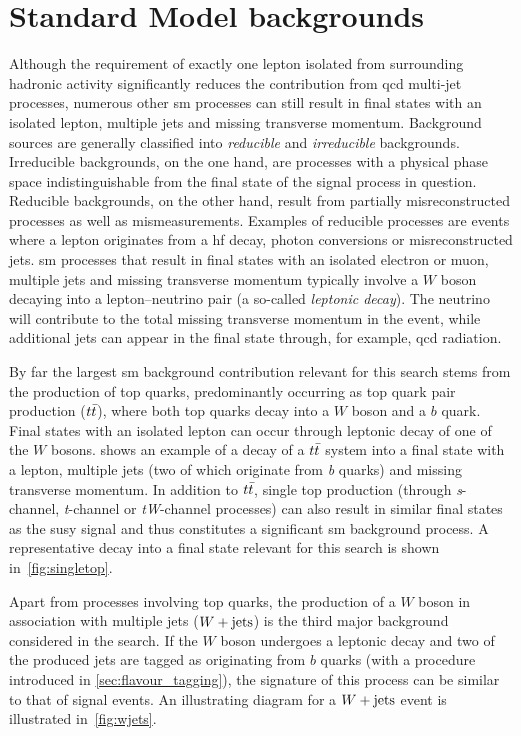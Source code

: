 \section{Standard Model backgrounds}

Although the requirement of exactly one lepton isolated from surrounding hadronic activity significantly reduces the contribution from \gls{qcd} multi-jet processes, numerous other \gls{sm} processes can still result in final states with an isolated lepton, multiple jets and missing transverse momentum.
Background sources are generally classified into \textit{reducible} and \textit{irreducible} backgrounds. Irreducible backgrounds, on the one hand, are processes with a physical phase space indistinguishable from the final state of the signal process in question. Reducible backgrounds, on the other hand, result from partially misreconstructed processes as well as mismeasurements.
Examples of reducible processes are events where a lepton originates from a \gls{hf} decay, photon conversions or misreconstructed jets. \gls{sm} processes that result in final states with an isolated electron or muon, multiple jets and missing transverse momentum typically involve a $W$ boson decaying into a lepton--neutrino pair (a so-called \textit{leptonic decay}).
The neutrino will contribute to the total missing transverse momentum in the event, while additional jets can appear in the final state through, for example, \gls{qcd} radiation.

By far the largest \gls{sm} background contribution relevant for this search stems from the production of top quarks, predominantly occurring as top quark pair production ($t\bar{t}$), where both top quarks decay into a $W$ boson and a $b$ quark. Final states with an isolated lepton can occur through leptonic decay of one of the $W$ bosons.
 shows an example of a decay of a $t\bar{t}$ system into a final state with a lepton, multiple jets (two of which originate from \textit{b} quarks) and missing transverse momentum.
In addition to $t\bar{t}$, single top production (through \textit{s}-channel, \textit{t}-channel or \textit{tW}-channel processes) can also result in similar final states as the \gls{susy} signal and thus constitutes a significant \gls{sm} background process.
A representative decay into a final state relevant for this search is shown in~\cref{fig:singletop}.

Apart from processes involving top quarks, the production of a $W$ boson in association with multiple jets ($W+\mathrm{jets}$) is the third major background considered in the \onelepton search.
If the $W$ boson undergoes a leptonic decay and two of the produced jets are tagged as originating from $b$ quarks (with a procedure introduced in \cref{sec:flavour_tagging}), the signature of this process can be similar to that of signal events.
An illustrating diagram for a $W+\mathrm{jets}$ event is illustrated in~\cref{fig:wjets}.

